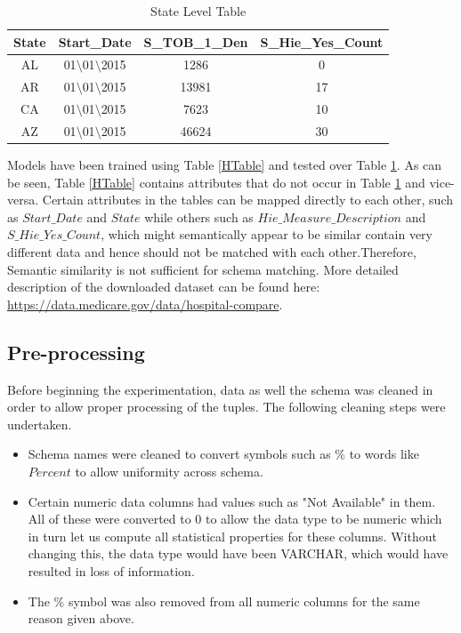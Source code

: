 \documentclass[conference]{IEEEtran}
\begin{document}
\begin{table}[h]
\centering
\caption{State Level Table}
\begin{tabular}{|c|c|c|c|}
\hline
State & Start\_Date & S\_TOB\_1\_Den & S\_Hie\_Yes\_Count\\
\hline \hline
AL & 01$\setminus$01$\setminus$2015 & 1286 & 0 \\
\hline
AR & 01$\setminus$01$\setminus$2015 & 13981 & 17 \\
\hline
CA & 01$\setminus$01$\setminus$2015 & 7623 & 10 \\
\hline
AZ & 01$\setminus$01$\setminus$2015 & 46624 & 30 \\
\hline

\end{tabular}
\label{STable}
\end{table}

Models have been trained using Table \ref{HTable} and tested over Table \ref{STable}. As can be seen, Table \ref{HTable} contains attributes that do not occur in Table \ref{STable} and vice-versa. Certain attributes in the tables can be mapped directly to each other, such as $Start\_Date$ and $State$ while others such as $Hie\_Measure\_Description$ and $S\_Hie\_Yes\_Count$, which might semantically appear to be similar contain very different data and hence should not be matched with each other.Therefore, Semantic similarity is not sufficient for schema matching. More detailed description of the downloaded dataset can be found here: \url{https://data.medicare.gov/data/hospital-compare}.

\subsection{Pre-processing}
Before beginning the experimentation, data as well the schema was cleaned in order to allow proper processing of the tuples. The following cleaning steps were undertaken.
\begin{itemize}
\item Schema names were cleaned to convert symbols such as $\%$ to words like $Percent$ to allow uniformity across schema. 
\item Certain numeric data columns had values such as "Not Available" in them. All of these were converted to 0 to allow the data type to be numeric which in turn let us compute all statistical properties for these columns. Without changing this, the data type would have been VARCHAR, which would have resulted in loss of information.
\item The $\%$ symbol was also removed from all numeric columns for the same reason given above.
\end{itemize}
\end{document}
